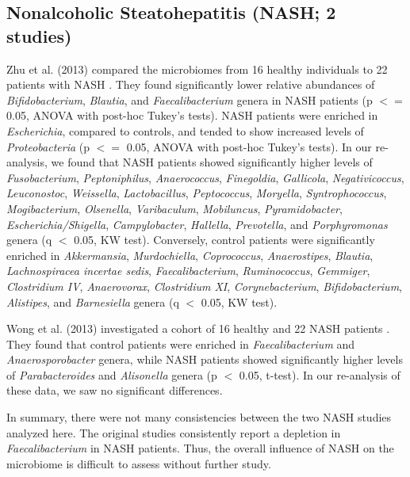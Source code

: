\documentclass{article}
\begin{document}
{\subsection*{Nonalcoholic Steatohepatitis (NASH; 2 studies)}

Zhu et al. (2013) compared the microbiomes from 16 healthy individuals to 22 patients with NASH \cite{nash-baker}. 
They found significantly lower relative abundances of \textit{Bifidobacterium}, \textit{Blautia}, and \textit{Faecalibacterium} genera in NASH patients (p $<=$ 0.05, ANOVA with post-hoc Tukey's tests). 
NASH patients were enriched in \textit{Escherichia}, compared to controls, and tended to show increased levels of \textit{Proteobacteria} (p $<=$ 0.05, ANOVA with post-hoc Tukey's tests). 
In our re-analysis, we found that NASH patients showed significantly higher levels of \textit{Fusobacterium}, \textit{Peptoniphilus}, \textit{Anaerococcus}, \textit{Finegoldia}, \textit{Gallicola}, \textit{Negativicoccus}, \textit{Leuconostoc}, \textit{Weissella}, \textit{Lactobacillus}, \textit{Peptococcus}, \textit{Moryella}, \textit{Syntrophococcus}, \textit{Mogibacterium}, \textit{Olsenella}, \textit{Varibaculum}, \textit{Mobiluncus}, \textit{Pyramidobacter}, \textit{Escherichia/Shigella}, \textit{Campylobacter}, \textit{Hallella}, \textit{Prevotella}, and \textit{Porphyromonas} genera (q $<$ 0.05, KW test). 
Conversely, control patients were significantly enriched in \textit{Akkermansia}, \textit{Murdochiella}, \textit{Coprococcus}, \textit{Anaerostipes}, \textit{Blautia}, \textit{Lachnospiracea incertae sedis}, \textit{Faecalibacterium}, \textit{Ruminococcus}, \textit{Gemmiger}, \textit{Clostridium IV}, \textit{Anaerovorax}, \textit{Clostridium XI}, \textit{Corynebacterium}, \textit{Bifidobacterium}, \textit{Alistipes}, and \textit{Barnesiella} genera (q $<$ 0.05, KW test).

Wong et al. (2013) investigated a cohort of 16 healthy and 22 NASH patients \cite{nash-chan}. 
They found that control patients were enriched in \textit{Faecalibacterium} and \textit{Anaerosporobacter} genera, while NASH patients showed significantly higher levels of \textit{Parabacteroides} and \textit{Alisonella} genera (p $<$ 0.05, t-test). 
In our re-analysis of these data, we saw no significant differences.

In summary, there were not many consistencies between the two NASH studies analyzed here. 
The original studies consistently report a depletion in \textit{Faecalibacterium} in NASH patients.  
Thus, the overall influence of NASH on the microbiome is difficult to assess without further study.

}
\end{document}
